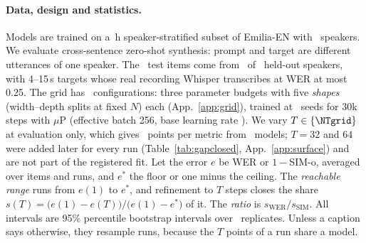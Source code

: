 \paragraph{Data, design and statistics.}
Models are trained on a \NtrainHours\,h speaker-stratified subset of Emilia-EN \citep{emilia}
with \Nspeakers\ speakers. We evaluate cross-sentence zero-shot synthesis: prompt and target
are different utterances of one speaker. The \NevalItems\ test items come from
\NevalSpeakers\ of \NheldoutSpk\ held-out speakers, with 4--15\,s targets whose real
recording Whisper transcribes at WER at most 0.25. The grid has \Nconfigs\ configurations:
three parameter budgets with five \emph{shapes} (width--depth splits at fixed $N$) each
(App.~\ref{app:grid}), trained at \Nseeds\ seeds for 30k steps with $\mu$P \citep{mup}
(effective batch 256, base learning rate \Nbaselr). We vary $T \in \{\NTgrid\}$ at evaluation
only, which gives \Nsurface\ points per metric from \Nruns\ models; $T{=}32$ and $64$ were
added later for every run (Table~\ref{tab:gapclosed}, App.~\ref{app:surface}) and are not
part of the registered fit. Let the error $e$ be WER
or $1-$SIM-o, averaged over items and runs, and $e^{*}$ the floor or one minus the ceiling.
The \emph{reachable range} runs from $e(1)$ to $e^{*}$, and refinement to $T$ steps closes
the share $s(T) = \bigl(e(1)-e(T)\bigr)/\bigl(e(1)-e^{*}\bigr)$ of it. The \emph{ratio} is
$s_{\mathrm{WER}}/s_{\mathrm{SIM}}$. All intervals are 95\% percentile bootstrap intervals
\citep{efron1979bootstrap} over \Nbootreps\ replicates. Unless a caption says otherwise, they
resample runs, because the $T$ points of a run share a model.
